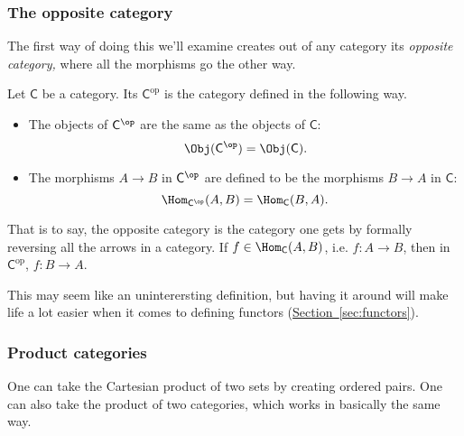 \documentclass[main.tex]{subfiles}
\begin{document}
\subsubsection{The opposite category}

The first way of doing this we'll examine creates out of any category its \emph{opposite category,} where all the morphisms go the other way.

\begin{definition}
  \label{def:oppositecategory}
  Let $\mathsf{C}$ be a category. Its  $\mathsf{C}^{\mathrm{op}}$ is the category defined in the following way.
  \begin{itemize}
    \item The objects of $\mathsf{C}^{\op}$ are the same as the objects of $\mathsf{C}$:
      \begin{equation*}
        \Obj(\mathsf{C}^{\op}) = \Obj(\mathsf{\mathsf{C}}).
      \end{equation*}

    \item The morphisms $A \to B$ in $\mathsf{C}^{\op}$ are defined to be the morphisms $B \to A$ in $\mathsf{C}$:
      \begin{equation*}
        \Hom_{\mathsf{C}^{\op}}(A, B) = \Hom_{\mathsf{C}}(B, A).
      \end{equation*}
  \end{itemize}

  That is to say, the opposite category is the category one gets by formally reversing all the arrows in a category. If $f \in \Hom_{\mathsf{C}}(A, B)$, i.e. $f \colon A \to B$, then in $\mathsf{C}^{\mathrm{op}}$, $f\colon B \to A$.
\end{definition}

This may seem like an uninterersting definition, but having it around will make life a lot easier when it comes to defining functors (\hyperref[sec:functors]{Section~\ref*{sec:functors}}).


\subsubsection{Product categories}

One can take the Cartesian product of two sets by creating ordered pairs. One can also take the product of two categories, which works in basically the same way.
\end{document}
